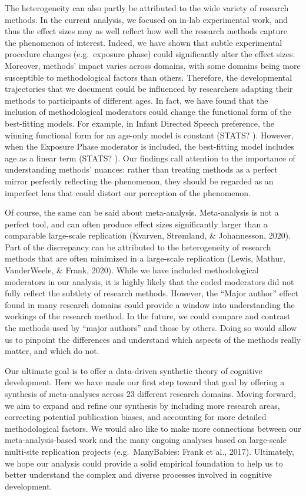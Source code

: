 \documentclass[10pt, letterpaper]{article}
\begin{document}
The heterogeneity can also partly be attributed to the wide variety of
research methods. In the current analysis, we focused on in-lab
experimental work, and thus the effect sizes may as well reflect how
well the research methods capture the phenomenon of interest. Indeed, we
have shown that subtle experimental procedure changes (e.g.~exposure
phase) could significantly alter the effect sizes. Moreover, methods'
impact varies across domains, with some domains being more susceptible
to methodological factors than others. Therefore, the developmental
trajectories that we document could be influenced by researchers
adapting their methods to participants of different ages. In fact, we
have found that the inclusion of methodological moderators could change
the functional form of the best-fitting models. For example, in Infant
Directed Speech preference, the winning functional form for an age-only
model is constant (STATS? ). However, when the Exposure Phase moderator
is included, the best-fitting model includes age as a linear term
(STATS? ). Our findings call attention to the importance of
understanding methods' nuances: rather than treating methods as a
perfect mirror perfectly reflecting the phenomenon, they should be
regarded as an imperfect lens that could distort our perception of the
phenomenon.

Of course, the same can be said about meta-analysis. Meta-analysis is
not a perfect tool, and can often produce effect sizes significantly
larger than a comparable large-scale replication (Kvarven, Strømland, \&
Johannesson, 2020). Part of the discrepancy can be attributed to the
heterogeneity of research methods that are often minimized in a
large-scale replication (Lewis, Mathur, VanderWeele, \& Frank, 2020).
While we have included methodological moderators in our analysis, it is
highly likely that the coded moderators did not fully reflect the
subtlety of research methods. However, the ``Major author'' effect found
in many research domains could provide a window into understanding the
workings of the research method. In the future, we could compare and
contrast the methods used by ``major authors'' and those by others.
Doing so would allow us to pinpoint the differences and understand which
aspects of the methods really matter, and which do not.

Our ultimate goal is to offer a data-driven synthetic theory of
cognitive development. Here we have made our first step toward that goal
by offering a synthesis of meta-analyses across 23 different research
domains. Moving forward, we aim to expand and refine our synthesis by
including more research areas, correcting potential publication biases,
and accounting for more detailed methodological factors. We would also
like to make more connections between our meta-analysis-based work and
the many ongoing analyses based on large-scale multi-site replication
projects (e.g.~ManyBabies: Frank et al., 2017). Ultimately, we hope our
analysis could provide a solid empirical foundation to help us to better
understand the complex and diverse processes involved in cognitive
development.
\end{document}
